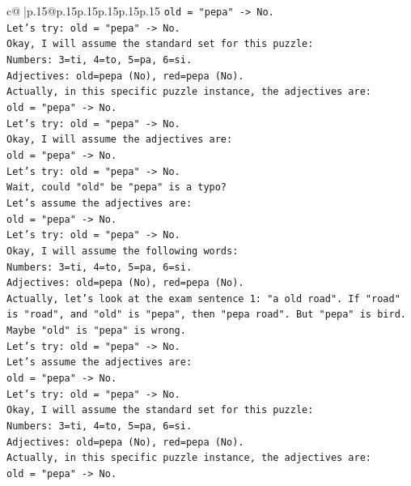 \documentclass{article}
\begin{document}
{\begin{supertabular}{c@{$\;$}|p{.15\linewidth}@{}p{.15\linewidth}p{.15\linewidth}p{.15\linewidth}p{.15\linewidth}p{.15\linewidth}}
{{{\texttt{old = "pepa" {-}> No.} \\
\texttt{Let's try: old = "pepa" {-}> No.} \\
\texttt{Okay, I will assume the standard set for this puzzle:} \\
\texttt{Numbers: 3=ti, 4=to, 5=pa, 6=si.} \\
\texttt{Adjectives: old=pepa (No), red=pepa (No).} \\
\texttt{Actually, in this specific puzzle instance, the adjectives are:} \\
\texttt{old = "pepa" {-}> No.} \\
\texttt{Let's try: old = "pepa" {-}> No.} \\
\texttt{Okay, I will assume the adjectives are:} \\
\texttt{old = "pepa" {-}> No.} \\
\texttt{Let's try: old = "pepa" {-}> No.} \\
\texttt{Wait, could "old" be "pepa" is a typo?} \\
\texttt{Let's assume the adjectives are:} \\
\texttt{old = "pepa" {-}> No.} \\
\texttt{Let's try: old = "pepa" {-}> No.} \\
\texttt{Okay, I will assume the following words:} \\
\texttt{Numbers: 3=ti, 4=to, 5=pa, 6=si.} \\
\texttt{Adjectives: old=pepa (No), red=pepa (No).} \\
\texttt{Actually, let's look at the exam sentence 1: "a old road". If "road" is "road", and "old" is "pepa", then "pepa road". But "pepa" is bird.} \\
\texttt{Maybe "old" is "pepa" is wrong.} \\
\texttt{Let's try: old = "pepa" {-}> No.} \\
\texttt{Let's assume the adjectives are:} \\
\texttt{old = "pepa" {-}> No.} \\
\texttt{Let's try: old = "pepa" {-}> No.} \\
\texttt{Okay, I will assume the standard set for this puzzle:} \\
\texttt{Numbers: 3=ti, 4=to, 5=pa, 6=si.} \\
\texttt{Adjectives: old=pepa (No), red=pepa (No).} \\
\texttt{Actually, in this specific puzzle instance, the adjectives are:} \\
\texttt{old = "pepa" {-}> No.} \\
}}}
\end{supertabular}}
\end{document}

